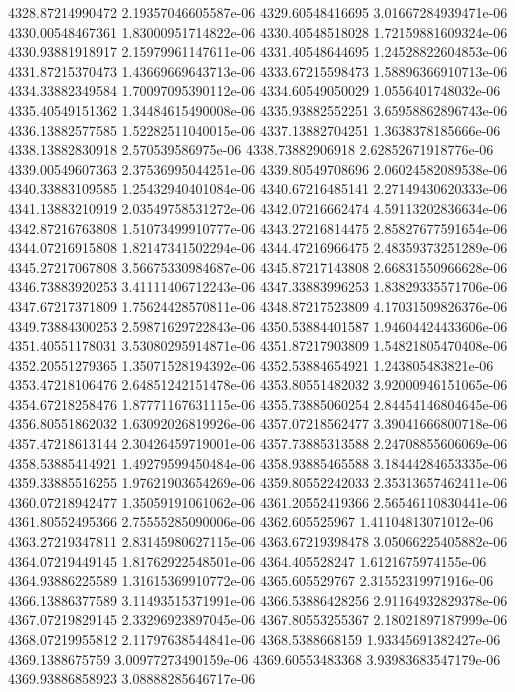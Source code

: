{4328.87214990472 2.19357046605587e-06
4329.60548416695 3.01667284939471e-06
4330.00548467361 1.83000951714822e-06
4330.40548518028 1.72159881609324e-06
4330.93881918917 2.15979961147611e-06
4331.40548644695 1.24528822604853e-06
4331.87215370473 1.43669669643713e-06
4333.67215598473 1.58896366910713e-06
4334.33882349584 1.70097095390112e-06
4334.60549050029 1.0556401748032e-06
4335.40549151362 1.34484615490008e-06
4335.93882552251 3.65958862896743e-06
4336.13882577585 1.52282511040015e-06
4337.13882704251 1.3638378185666e-06
4338.13882830918 2.570539586975e-06
4338.73882906918 2.62852671918776e-06
4339.00549607363 2.37536995044251e-06
4339.80549708696 2.06024582089538e-06
4340.33883109585 1.25432940401084e-06
4340.67216485141 2.27149430620333e-06
4341.13883210919 2.03549758531272e-06
4342.07216662474 4.59113202836634e-06
4342.87216763808 1.51073499910777e-06
4343.27216814475 2.85827677591654e-06
4344.07216915808 1.82147341502294e-06
4344.47216966475 2.48359373251289e-06
4345.27217067808 3.56675330984687e-06
4345.87217143808 2.66831550966628e-06
4346.73883920253 3.41111406712243e-06
4347.33883996253 1.83829335571706e-06
4347.67217371809 1.75624428570811e-06
4348.87217523809 4.17031509826376e-06
4349.73884300253 2.59871629722843e-06
4350.53884401587 1.94604424433606e-06
4351.40551178031 3.53080295914871e-06
4351.87217903809 1.54821805470408e-06
4352.20551279365 1.35071528194392e-06
4352.53884654921 1.243805483821e-06
4353.47218106476 2.64851242151478e-06
4353.80551482032 3.92000946151065e-06
4354.67218258476 1.87771167631115e-06
4355.73885060254 2.84454146804645e-06
4356.80551862032 1.63092026819926e-06
4357.07218562477 3.39041666800718e-06
4357.47218613144 2.30426459719001e-06
4357.73885313588 2.24708855606069e-06
4358.53885414921 1.49279599450484e-06
4358.93885465588 3.18444284653335e-06
4359.33885516255 1.97621903654269e-06
4359.80552242033 2.35313657462411e-06
4360.07218942477 1.35059191061062e-06
4361.20552419366 2.56546110830441e-06
4361.80552495366 2.75555285090006e-06
4362.605525967 1.41104813071012e-06
4363.27219347811 2.83145980627115e-06
4363.67219398478 3.05066225405882e-06
4364.07219449145 1.81762922548501e-06
4364.405528247 1.6121675974155e-06
4364.93886225589 1.31615369910772e-06
4365.605529767 2.31552319971916e-06
4366.13886377589 3.11493515371991e-06
4366.53886428256 2.91164932829378e-06
4367.07219829145 2.33296923897045e-06
4367.80553255367 2.18021897187999e-06
4368.07219955812 2.11797638544841e-06
4368.5388668159 1.93345691382427e-06
4369.1388675759 3.00977273490159e-06
4369.60553483368 3.93983683547179e-06
4369.93886858923 3.08888285646717e-06
}
